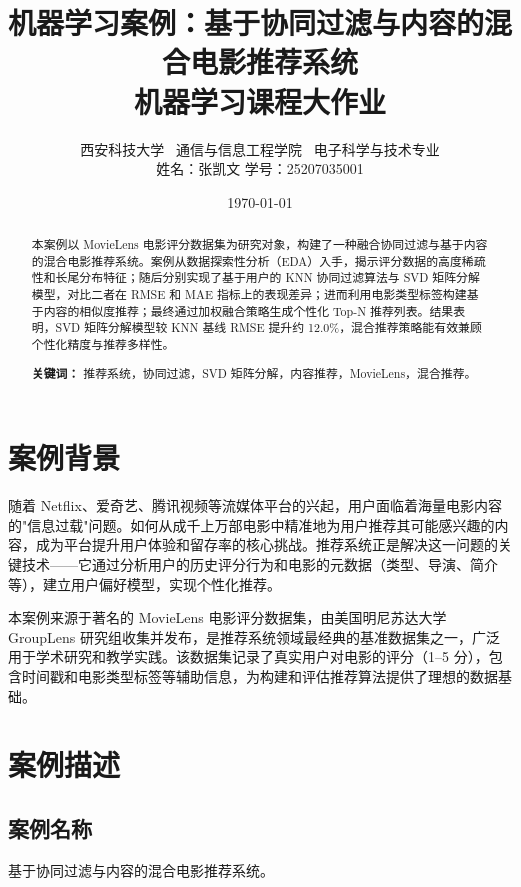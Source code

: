\documentclass[12pt,a4paper]{ctexart}
\title{\textbf{机器学习案例：基于协同过滤与内容的混合电影推荐系统}\\[0.4cm]
\large 机器学习课程大作业}
\author{西安科技大学 \ 通信与信息工程学院 \ 电子科学与技术专业 \\
姓名：张凯文 \quad 学号：25207035001}
\date{\today}
\begin{document}
\maketitle

\begin{abstract}
\noindent
本案例以 MovieLens 电影评分数据集为研究对象，构建了一种融合协同过滤与基于内容的混合电影推荐系统。案例从数据探索性分析（EDA）入手，揭示评分数据的高度稀疏性和长尾分布特征；随后分别实现了基于用户的 KNN 协同过滤算法与 SVD 矩阵分解模型，对比二者在 RMSE 和 MAE 指标上的表现差异；进而利用电影类型标签构建基于内容的相似度推荐；最终通过加权融合策略生成个性化 Top-N 推荐列表。结果表明，SVD 矩阵分解模型较 KNN 基线 RMSE 提升约 12.0\%，混合推荐策略能有效兼顾个性化精度与推荐多样性。

\noindent \textbf{关键词：} 推荐系统，协同过滤，SVD 矩阵分解，内容推荐，MovieLens，混合推荐。
\end{abstract}

\section{案例背景}

随着 Netflix、爱奇艺、腾讯视频等流媒体平台的兴起，用户面临着海量电影内容的"信息过载"问题。如何从成千上万部电影中精准地为用户推荐其可能感兴趣的内容，成为平台提升用户体验和留存率的核心挑战。推荐系统正是解决这一问题的关键技术——它通过分析用户的历史评分行为和电影的元数据（类型、导演、简介等），建立用户偏好模型，实现个性化推荐。

本案例来源于著名的 MovieLens 电影评分数据集，由美国明尼苏达大学 GroupLens 研究组收集并发布\cite{harper2015movielens}，是推荐系统领域最经典的基准数据集之一，广泛用于学术研究和教学实践。该数据集记录了真实用户对电影的评分（1--5 分），包含时间戳和电影类型标签等辅助信息，为构建和评估推荐算法提供了理想的数据基础。

\section{案例描述}

\subsection{案例名称}

基于协同过滤与内容的混合电影推荐系统。
\end{document}
